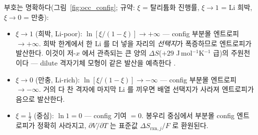 \documentclass[11pt,a4paper]{article}
\newcommand{\rxn}{\mathrm{rxn}}
\begin{document}
부호는 명확하다(그림~\ref{fig:occ_config}; 규약: $\xi$ = 탈리튬화 진행률, $\xi\to1$ = Li 희박, $\xi\to0$ = 만충):
\begin{itemize}[leftmargin=1.4em,itemsep=1pt]
\item $\xi\to1$ (희박, Li-poor): $\ln[\xi/(1-\xi)]\to+\infty$ — config 부분몰 엔트로피 $\to+\infty$. 희박
한계에서 한 Li 를 더 넣을 자리의 \emph{선택지}가 폭증하므로 엔트로피가 발산한다. 이것이 저-$x$ 에서
관측되는 큰 양의 $\Delta S$($+29$ J\,mol$^{-1}$K$^{-1}$ 급)의 주원천이다 — dilute 격자기체 모형이 같은
발산을 예측한다 \cite{occupation2019}.
\item $\xi\to0$ (만충, Li-rich): $\ln[\xi/(1-\xi)]\to-\infty$ — config 부분몰 엔트로피 $\to-\infty$. 거의 다 찬
격자에 마지막 Li 를 끼우면 배열 선택지가 사라져 엔트로피가 음으로 발산한다.
\item $\xi=\tfrac12$ (중심): $\ln 1=0$ — config 기여 $=0$. 봉우리 중심에서 부분몰 config 엔트로피가 정확히
사라지고, $\partial V/\partial T$ 는 표준값 $\Delta S_{\rxn,j}/F$ 로 환원된다.
\end{itemize}
\end{document}
